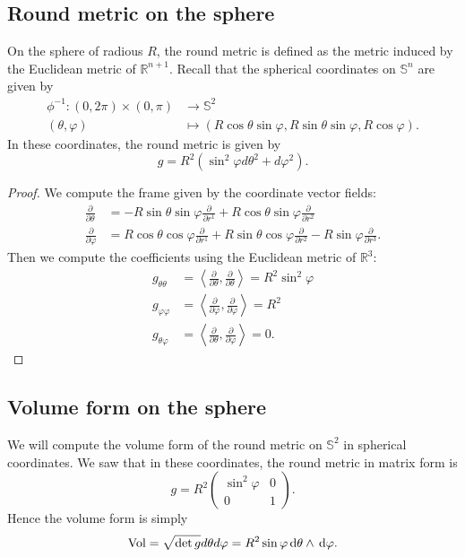 \documentclass{report}
\begin{document}
\subsection{Round metric on the sphere}
    On the sphere of radious $R$, the round metric is defined as the metric induced by the Euclidean metric of $\mathbb R^{n+1}$.
    Recall that the spherical coordinates on $\mathbb S^n$ are given by
    \begin{align*}
        \phi^{-1}: (0,2\pi) \times (0,\pi) &\to \mathbb S^2\\
        (\theta, \varphi) &\mapsto (R \cos \theta \sin \varphi, R \sin \theta \sin \varphi, R \cos \varphi).
    \end{align*}
    In these coordinates, the round metric is given by
    \[
    g = R^2 (\sin^2 \varphi d\theta^2 + d\varphi^2).
    \]
    \begin{proof}
        We compute the frame given by the coordinate vector fields:
        \begin{align*}
            \frac{\partial}{\partial \theta} &= -R \sin \theta \sin \varphi \frac{\partial}{\partial r^1} + R \cos \theta \sin \varphi \frac{\partial}{\partial r^2}  \\
            \frac{\partial}{\partial \varphi} &= R \cos \theta \cos \varphi \frac{\partial}{\partial r^1} + R \sin \theta \cos \varphi \frac{\partial}{\partial r^2} - R \sin \varphi \frac{\partial}{\partial r^3}.
        \end{align*}
        Then we compute the coefficients using the Euclidean metric of $\mathbb R^3$:
    \begin{align*}
        g_{\theta \theta} &= \left\langle \frac{\partial}{\partial \theta}, \frac{\partial}{\partial \theta} \right\rangle = R^2 \sin^2 \varphi\\
        g_{\varphi \varphi} &= \left\langle \frac{\partial}{\partial \varphi}, \frac{\partial}{\partial \varphi} \right\rangle = R^2\\
        g_{\theta \varphi} &= \left\langle \frac{\partial}{\partial \theta}, \frac{\partial}{\partial \varphi} \right\rangle = 0.
    \end{align*}
    \end{proof}
\subsection{Volume form on the sphere}
We will compute the volume form of the round metric on $\mathbb S^2$ in spherical coordinates.
We saw that in these coordinates, the round metric in matrix form is
\[
g = R^2 \begin{pmatrix}
\sin^2 \varphi & 0 \\
0 & 1
\end{pmatrix}.
\]
Hence the volume form is simply
\[
\text{Vol} = \sqrt{\det g} d\theta d\varphi = R^2 \sin \varphi \,\mathrm{d}\theta \wedge \,\mathrm{d}\varphi.
\]
\end{document}
